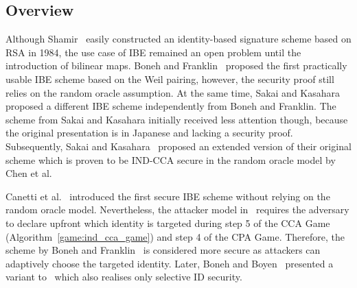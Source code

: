 
\subsection{Overview}
\label{sec:evolution_of_ibe}
Although Shamir~\cite{art:Shamir84} easily constructed an identity-based signature scheme based on RSA in 1984, the use case of IBE remained an open problem until the introduction of bilinear maps. Boneh and Franklin~\cite{art:BonehF01} proposed the first practically usable IBE scheme based on the Weil pairing, however, the security proof still relies on the random oracle assumption. At the same time, Sakai and Kasahara~\cite{art:SakaiOK01} proposed a different IBE scheme independently from Boneh and Franklin. The scheme from Sakai and Kasahara initially received less attention though, because the original presentation is in Japanese and lacking a security proof. Subsequently, Sakai and Kasahara~\cite{art:SakaiK03} proposed an extended version of their original scheme which is proven to be IND-CCA secure in the random oracle model by Chen et al.~\cite{art:ChenC05} 

Canetti et al.~\cite{art:CanettiHK03} introduced the first secure IBE scheme without relying on the random oracle model. Nevertheless, the attacker model in~\cite{art:CanettiHK03} requires the adversary to declare upfront which identity \id{} is targeted during step 5 of the CCA Game (Algorithm~\ref{game:ind_cca_game}) and step 4 of the CPA Game. Therefore, the scheme by Boneh and Franklin~\cite{art:BonehF01} is considered more secure as attackers can adaptively choose the targeted identity. Later, Boneh and Boyen~\cite{art:BonehB04} presented a variant to~\cite{art:CanettiHK03} which also realises only selective ID security.

